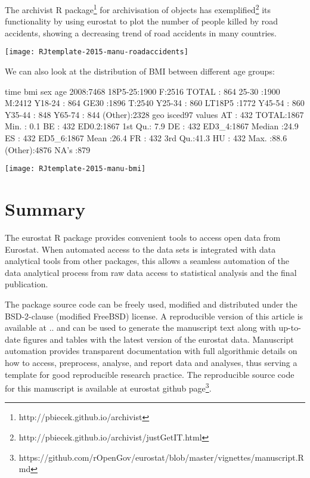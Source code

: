 The archivist R package\footnote{http://pbiecek.github.io/archivist} for archivisation of objects has exemplified\footnote{http://pbiecek.github.io/archivist/justGetIT.html} its functionality by using eurostat to plot the number of people killed by road accidents, showing a decreasing trend of road accidents in many countries.

\texttt{[image: RJtemplate-2015-manu-roadaccidents]}


We can also look at the distribution of BMI between different age groups:

\begin{Schunk}
\begin{Soutput}
   time           bmi       sex           age      
 2008:7468   18P5-25:1900   F:2516   TOTAL  : 864  
             25-30  :1900   M:2412   Y18-24 : 864  
             GE30   :1896   T:2540   Y25-34 : 860  
             LT18P5 :1772            Y45-54 : 860  
                                     Y35-44 : 848  
                                     Y65-74 : 844  
                                     (Other):2328  
      geo        isced97         values    
 AT     : 432   TOTAL:1867   Min.   : 0.1  
 BE     : 432   ED0.2:1867   1st Qu.: 7.9  
 DE     : 432   ED3_4:1867   Median :24.9  
 ES     : 432   ED5_6:1867   Mean   :26.4  
 FR     : 432                3rd Qu.:41.3  
 HU     : 432                Max.   :88.6  
 (Other):4876                NA's   :879   
\end{Soutput}
\end{Schunk}
\texttt{[image: RJtemplate-2015-manu-bmi]}
 



\section{Summary}

The eurostat R package provides convenient tools to access open data
from Eurostat. When automated access to the data sets is integrated
with data analytical tools from other packages, this allows a seamless
automation of the data analytical process from raw data access to
statistical analysis and the final publication.

The package source code can be freely used, modified and distributed
under the BSD-2-clause (modified FreeBSD) license. A reproducible
version of this article is available at .. and can be used to generate
the manuscript text along with up-to-date figures and tables with the
latest version of the eurostat data. Manuscript automation provides
transparent documentation with full algorithmic details on how to
access, preprocess, analyse, and report data and analyses, thus
serving a template for good reproducible research practice. The reproducible source code for this manuscript is available at eurostat github page\footnote{https://github.com/rOpenGov/eurostat/blob/master/vignettes/manuscript.Rmd}.

